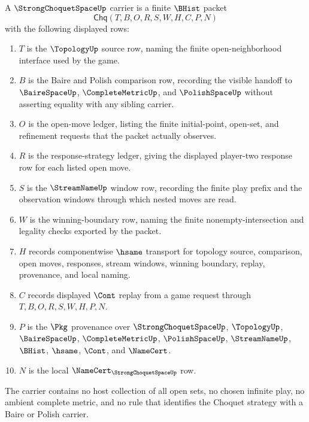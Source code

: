 \begin{definition}
\label{def:strong-choquet-space-carrier}
A $\StrongChoquetSpaceUp$ carrier is a finite $\BHist$ packet
$$
\mathsf{Chq}(T,B,O,R,S,W,H,C,P,N)
$$
with the following displayed rows:
\begin{enumerate}
\item $T$ is the $\TopologyUp$ source row, naming the finite open-neighborhood interface used by the game.
\item $B$ is the Baire and Polish comparison row, recording the visible handoff to $\BaireSpaceUp$, $\CompleteMetricUp$, and $\PolishSpaceUp$ without asserting equality with any sibling carrier.
\item $O$ is the open-move ledger, listing the finite initial-point, open-set, and refinement requests that the packet actually observes.
\item $R$ is the response-strategy ledger, giving the displayed player-two response row for each listed open move.
\item $S$ is the $\StreamNameUp$ window row, recording the finite play prefix and the observation windows through which nested moves are read.
\item $W$ is the winning-boundary row, naming the finite nonempty-intersection and legality checks exported by the packet.
\item $H$ records componentwise $\hsame$ transport for topology source, comparison, open moves, responses, stream windows, winning boundary, replay, provenance, and local naming.
\item $C$ records displayed $\Cont$ replay from a game request through $T,B,O,R,S,W,H,P,N$.
\item $P$ is the $\Pkg$ provenance over $\StrongChoquetSpaceUp$, $\TopologyUp$, $\BaireSpaceUp$, $\CompleteMetricUp$, $\PolishSpaceUp$, $\StreamNameUp$, $\BHist$, $\hsame$, $\Cont$, and $\NameCert$.
\item $N$ is the local $\NameCert_{\StrongChoquetSpaceUp}$ row.
\end{enumerate}
The carrier contains no host collection of all open sets, no chosen infinite play, no ambient complete metric, and no rule that identifies the Choquet strategy with a Baire or Polish carrier.
\end{definition}

